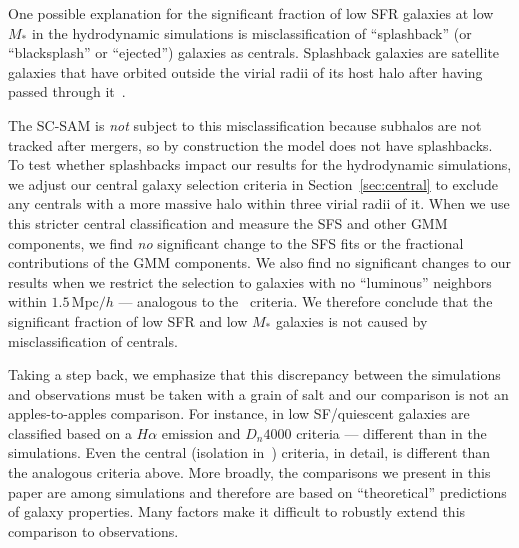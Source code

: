 \documentclass[tighten, preprint]{aastex62}
\begin{document}
One possible explanation for the significant fraction of low SFR galaxies
at low $M_*$ in the hydrodynamic simulations is misclassification of 
``splashback'' (or ``blacksplash'' or ``ejected'') galaxies as centrals. 
Splashback galaxies are satellite galaxies that have orbited outside 
the virial radii of its host halo after having passed through 
it~\citep[\emph{e.g.}][]{mamon2004,gill2005,wang2009a,wetzel2014}.
{\color{red} The SC-SAM is {\em not} subject to this misclassification 
because subhalos are not tracked after mergers, so by construction the 
model does not have splashbacks. To test whether splashbacks 
impact our results for the hydrodynamic simulations, we adjust our central
galaxy selection criteria in Section~\ref{sec:central} to exclude 
any centrals with a more massive halo within three virial radii of it. 
When we use this stricter central classification and measure the
SFS and other GMM components, we find \emph{no} significant change to 
the SFS fits or the fractional contributions of the GMM components. 
We also find no significant changes to our results when we restrict 
the selection to galaxies with no ``luminous'' neighbors within 
$1.5\,\mathrm{Mpc}/h$ --- analogous to the~\cite{geha2012} criteria.
We therefore conclude that the significant fraction of low SFR and 
low $M_*$ galaxies is not caused by misclassification of centrals.


Taking a step back, we emphasize that this discrepancy between the 
simulations and observations must be taken with a grain of salt and
our comparison is not an apples-to-apples comparison. For instance,
in \cite{geha2012} low SF/quiescent galaxies are classified based on 
a $H\alpha$ emission and $D_n 4000$ criteria --- different than in 
the simulations. Even the central (isolation in~\citealt{geha2012}) 
criteria, in detail, is different than the analogous criteria 
above. More broadly, the comparisons we present in this paper are 
among simulations and therefore are based on ``theoretical'' predictions 
of galaxy properties. Many factors make it difficult 
to robustly extend this comparison to observations. 

}
\end{document}
